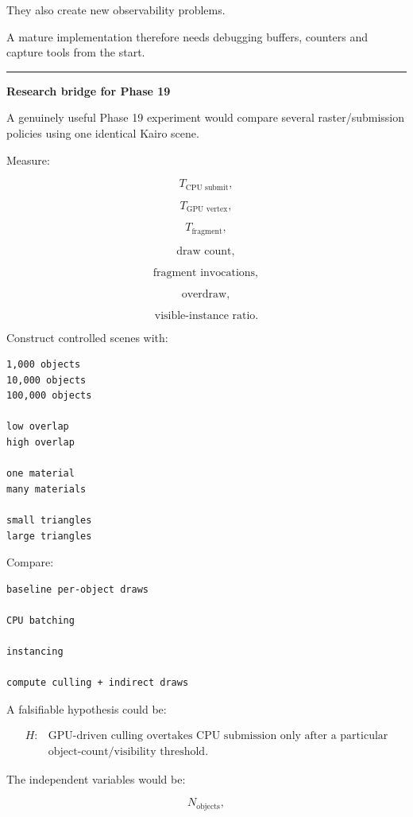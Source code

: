 They also create new observability problems.

A mature implementation therefore needs debugging buffers, counters and capture tools from the start.

\begin{center}\rule{0.5\linewidth}{0.5pt}\end{center}

\textbf{Research bridge for Phase 19}

A genuinely useful Phase 19 experiment would compare several raster/submission policies using one identical Kairo scene.

Measure:

\[
T_{\text{CPU submit}},
\]

\[
T_{\text{GPU vertex}},
\]

\[
T_{\text{fragment}},
\]

\[
\text{draw count},
\]

\[
\text{fragment invocations},
\]

\[
\text{overdraw},
\]

\[
\text{visible-instance ratio}.
\]

Construct controlled scenes with:

\begin{verbatim}
1,000 objects
10,000 objects
100,000 objects

low overlap
high overlap

one material
many materials

small triangles
large triangles
\end{verbatim}

Compare:

\begin{verbatim}
baseline per-object draws

CPU batching

instancing

compute culling + indirect draws
\end{verbatim}

A falsifiable hypothesis could be:

\[\begin{aligned}H: &\text{GPU-driven culling overtakes CPU submission only after a particular}\\&\text{object-count/visibility threshold.}\end{aligned}\]

The independent variables would be:

\[
N_{\text{objects}},
\]

